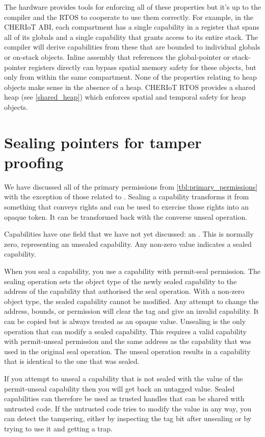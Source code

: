 The hardware provides tools for enforcing all of these properties but it's up to the compiler and the RTOS to cooperate to use them correctly.
For example, in the CHERIoT ABI, each compartment has a single capability in a register that spans all of its globals and a single capability that grants access to its entire stack.
The compiler will derive capabilities from these that are bounded to individual globals or on-stack objects.
Inline assembly that references the global-pointer or stack-pointer registers directly can bypass spatial memory safety for these objects, but only from within the same compartment.
None of the properties relating to heap objects make sense in the absence of a heap.
CHERIoT RTOS provides a shared heap (see \ref{shared_heap}) which enforces spatial and temporal safety for heap objects.

\section[label=sealing_intro]{Sealing pointers for tamper proofing}

We have discussed all of the primary permissions from \ref{tbl:primary_permissions} with the exception of those related to .
Sealing a capability transforms it from something that conveys rights and can be used to exercise those rights into an opaque token.
It can be transformed back with the converse unseal operation.

Capabilities have one field that we have not yet discussed: an .
This is normally zero, representing an unsealed capability.
Any non-zero value indicates a sealed capability.

When you seal a capability, you use a capability with permit-seal permission.
The sealing operation sets the object type of the newly sealed capability to the address of the capability that authorised the seal operation.
With a non-zero object type, the sealed capability cannot be modified.
Any attempt to change the address, bounds, or permission will clear the tag and give an invalid capability.
It can be copied but is always treated as an opaque value.
Unsealing is the only operation that can modify a sealed capability.
This requires a valid capability with permit-unseal permission and the same address as the capability that was used in the original seal operation.
The unseal operation results in a capability that is identical to the one that was sealed.

If you attempt to unseal a capability that is not sealed with the value of the permit-unseal capability then you will get back an untagged value.
Sealed capabilities can therefore be used as trusted handles that can be shared with untrusted code.
If the untrusted code tries to modify the value in any way, you can detect the tampering, either by inspecting the tag bit after unsealing or by trying to use it and getting a trap.


